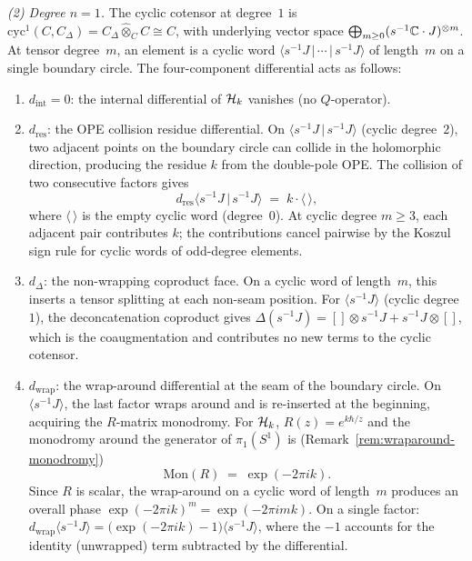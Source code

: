 \begin{computation}
\smallskip
\noindent
\emph{(2) Degree $n=1$.}
The cyclic cotensor at degree~$1$ is
$\mathrm{cyc}^1(C,C_\Delta) = C_\Delta \widehat\otimes_C C
\cong C$,
with underlying vector space
$\bigoplus_{m \ge 0} (s^{-1}\mathbb{C}\cdot J)^{\otimes m}$.
At tensor degree~$m$, an element is a cyclic word
$\langle s^{-1}J\,|\,\cdots\,|\,s^{-1}J\rangle$
of length~$m$ on a single boundary circle.
The four-component differential acts as follows:
\begin{enumerate}[label=\textup{(\alph*)}]
\item $d_{\mathrm{int}} = 0$:
 the internal differential of $\mathcal{H}_k$ vanishes
 (no $Q$-operator).
\item $d_{\mathrm{res}}$: the OPE collision residue
 differential. On $\langle s^{-1}J\,|\,s^{-1}J\rangle$
 (cyclic degree~$2$), two adjacent points on the
 boundary circle can collide in the holomorphic
 direction, producing the residue $k$ from the
 double-pole OPE\@. The collision of two consecutive
 factors gives
 \[
 d_{\mathrm{res}}\langle s^{-1}J\,|\,s^{-1}J\rangle
 \;=\; k \cdot \langle\,\rangle,
 \]
 where $\langle\,\rangle$ is the empty cyclic word
 (degree~$0$). At cyclic degree $m \ge 3$, each adjacent
 pair contributes $k$; the contributions cancel pairwise
 by the Koszul sign rule for cyclic words of odd-degree
 elements.
\item $d_\Delta$: the non-wrapping coproduct face.
 On a cyclic word of length~$m$, this inserts a tensor
 splitting at each non-seam position. For
 $\langle s^{-1}J \rangle$ (cyclic degree~$1$), the
 deconcatenation coproduct gives
 $\Delta(s^{-1}J) = [] \otimes s^{-1}J + s^{-1}J \otimes []$,
 which is the coaugmentation and contributes no new terms
 to the cyclic cotensor.
\item $d_{\mathrm{wrap}}$: the wrap-around differential
 at the seam of the boundary circle. On
 $\langle s^{-1}J \rangle$, the last factor wraps
 around and is re-inserted at the beginning,
 acquiring the $R$-matrix monodromy. For $\mathcal{H}_k$,
 $R(z) = e^{k\hbar/z}$ and the monodromy around
 the generator of $\pi_1(S^1)$ is
 (Remark~\ref{rem:wraparound-monodromy})
 \begin{equation}\label{eq:heisenberg-wrap-monodromy}
 \mathrm{Mon}(R) \;=\; \exp(-2\pi i k).
 \end{equation}
 Since $R$ is scalar, the wrap-around on a cyclic word
 of length~$m$ produces an overall phase
 $\exp(-2\pi i k)^m = \exp(-2\pi i m k)$.
 On a single factor:
 $d_{\mathrm{wrap}}\langle s^{-1}J \rangle
 = \bigl(\exp(-2\pi i k) - 1\bigr)\langle s^{-1}J \rangle$,
 where the $-1$ accounts for the identity (unwrapped)
 term subtracted by the differential.
\end{enumerate}


\end{computation}
